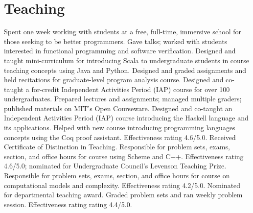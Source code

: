 \documentclass[10pt,a4paper]{moderncv}
\begin{document}
\section{Teaching}
  {}{Spent one week working with students at a free, full-time, immersive school for those seeking to be better programmers. Gave talks; worked with students interested in functional programming and software verification.}
  {}{Designed and taught mini-curriculum for introducing Scala to undergraduate students in course teaching concepts using Java and Python.}
  {}{Designed and graded assignments and held recitations for graduate-level program analysis course.}
  {}{Designed and co-taught a for-credit Independent Activities Period (IAP) course for over 100 undergraduates.  Prepared lectures and assignments; managed multiple graders; published materials on MIT's Open Courseware.}
  {}{Designed and co-taught an Independent Activities Period (IAP) course introducing the Haskell language and its applications.}
  {}{Helped with new course introducing programming languages concepts using the Coq proof assistant.  Effectiveness rating 4.6/5.0.  Received Certificate of Distinction in Teaching.}
  {Responsible for problem sets, exams, section, and office hours for course using Scheme and C++.  Effectiveness rating 4.6/5.0; nominated for Undergraduate Council's Levenson Teaching Prize.}
  {Responsible for problem sets, exams, section, and office hours for course on computational models and complexity.  Effectiveness rating 4.2/5.0.  Nominated for departmental teaching award.}
  {Graded problem sets and ran weekly problem session.  Effectiveness rating rating 4.4/5.0.}
\end{document}
